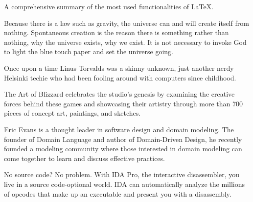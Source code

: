 \documentclass{article}
\begin{document}
A comprehensive summary of the most used functionalities of LaTeX. \cite{Menetrey2016LaTeX}

Because there is a law such as gravity, the universe can and will create itself from nothing. Spontaneous creation is the reason there is something rather than nothing, why the universe exists, why we exist. It is not necessary to invoke God to light the blue touch paper and set the universe going. \cite{Hawking2010Grand}

Once upon a time Linus Torvalds was a skinny unknown, just another nerdy Helsinki techie who had been fooling around with computers since childhood. \cite{Torvalds2001Just}

The Art of Blizzard celebrates the studio's genesis by examining the creative forces behind these games and showcasing their artistry through more than 700 pieces of concept art, paintings, and sketches. \cite{Entertainment2011Art}

Eric Evans is a thought leader in software design and domain modeling. The founder of Domain Language and author of Domain-Driven Design, he recently founded a modeling community where those interested in domain modeling can come together to learn and discuss effective practices. \cite{Evans2003Domain}

No source code? No problem. With IDA Pro, the interactive disassembler, you live in a source code-optional world. IDA can automatically analyze the millions of opcodes that make up an executable and present you with a disassembly. \cite{Eagle2011IDA}

\printbibheading

%
\printbibliography[keyword=en,heading=subbibliography,title={English Sources}]
\printbibliography[keyword=fr,heading=subbibliography,title={French Sources}]
\end{document}
